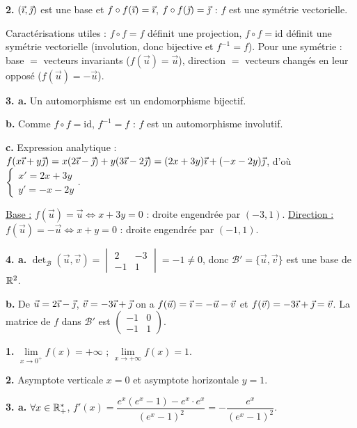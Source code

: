\documentclass[11pt]{article}
\begin{document}
\textbf{2.} $(\vec{\imath}, \vec{\jmath})$ est une base et $f\circ f(\vec{\imath}) = \vec{\imath}$, $f\circ f(\vec{\jmath}) = \vec{\jmath}$ : $f$ est une symétrie vectorielle.

\begin{rappel}
Caractérisations utiles : $f \circ f = f$ définit une projection,
$f \circ f = \mathrm{id}$ définit une symétrie vectorielle (involution,
donc bijective et $f^{-1} = f$). Pour une symétrie : base $=$ vecteurs
invariants ($f(\vec{u}) = \vec{u}$), direction $=$ vecteurs changés en
leur opposé ($f(\vec{u}) = -\vec{u}$).
\end{rappel}

\textbf{3. a.} Un automorphisme est un endomorphisme bijectif.

\textbf{b.} Comme $f\circ f = \mathrm{id}$, $f^{-1} = f$ : $f$ est un automorphisme involutif.

\textbf{c.} Expression analytique : $f(x\vec{\imath} + y\vec{\jmath}) = x(2\vec{\imath} - \vec{\jmath}) + y(3\vec{\imath} - 2\vec{\jmath}) = (2x + 3y)\vec{\imath} + (-x - 2y)\vec{\jmath}$, d'où $\begin{cases} x' = 2x + 3y \\ y' = -x - 2y \end{cases}$.

\underline{Base :} $f(\vec{u}) = \vec{u} \Leftrightarrow x + 3y = 0$ : droite engendrée par $(-3, 1)$. \underline{Direction :} $f(\vec{u}) = -\vec{u} \Leftrightarrow x + y = 0$ : droite engendrée par $(-1, 1)$.

\textbf{4. a.} $\det_{\mathscr{B}}(\vec{u}, \vec{v}) = \begin{vmatrix} 2 & -3 \\ -1 & 1 \end{vmatrix} = -1 \ne 0$, donc $\mathscr{B}' = \{\vec{u}, \vec{v}\}$ est une base de $\mathbb{R}^2$.

\textbf{b.} De $\vec{u} = 2\vec{\imath} - \vec{\jmath}$, $\vec{v} = -3\vec{\imath} + \vec{\jmath}$ on a $f(\vec{u}) = \vec{\imath} = -\vec{u} - \vec{v}$ et $f(\vec{v}) = -3\vec{\imath} + \vec{\jmath} = \vec{v}$. La matrice de $f$ dans $\mathscr{B}'$ est $\begin{pmatrix} -1 & 0 \\ -1 & 1 \end{pmatrix}$.

\textbf{1.} $\lim\limits_{x\to 0^+} f(x) = +\infty$ ; $\lim\limits_{x\to+\infty} f(x) = 1$.

\textbf{2.} Asymptote verticale $x = 0$ et asymptote horizontale $y = 1$.

\textbf{3. a.} $\forall x \in \mathbb{R}_+^*$, $f'(x) = \dfrac{e^x(e^x - 1) - e^x\cdot e^x}{(e^x - 1)^2} = -\dfrac{e^x}{(e^x - 1)^2}$.
\end{document}
